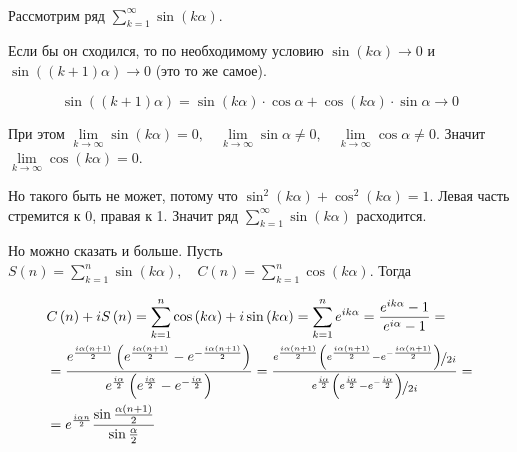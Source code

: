 \documentclass[../main.tex]{subfiles}
\begin{document}
\begin{example}
    
    ~

    Рассмотрим ряд \( \sum\limits_{ k=1}^{ \infty } \sin\left( k \alpha \right)\).

    Если бы он сходился, то по необходимому условию \( \sin\left( k \alpha \right) \longrightarrow 0\) и \( \sin \left( \left( k+1\right) \alpha \right) \longrightarrow 0\) (это то же самое). 

    \[ \sin\left( \left( k+1\right) \alpha \right)=\sin\left( k \alpha \right) \cdot \cos \alpha + \cos\left( k \alpha \right) \cdot \sin \alpha \longrightarrow 0\]

    При этом \( \lim\limits_{ k \rightarrow \infty } \sin\left( k \alpha \right) =0,\quad \lim\limits_{ k \rightarrow \infty } \sin \alpha \neq 0,\quad \lim\limits_{ k \rightarrow \infty } \cos \alpha \neq 0\). Значит \( \lim\limits_{ k \rightarrow \infty } \cos \left( k \alpha \right)=0\). 
    
    Но такого быть не может, потому что \( \sin^2\left( k \alpha \right)+\cos^2\left( k \alpha \right)=1\). Левая часть стремится к 0, правая к 1. Значит ряд \( \sum\limits_{ k=1}^{ \infty } \sin\left( k \alpha \right)\) расходится.

    Но можно сказать и больше. Пусть \( S\left( n\right)= \sum\limits_{ k=1}^{ n} \sin\left( k \alpha \right),\quad C\left( n\right)= \sum\limits_{ k=1}^{ n} \cos\left( k \alpha \right)\). Тогда

    \begin{equation*}
        \begin{aligned}
            & C\left( n\right)+iS\left( n\right)= \sum\limits_{ k=1}^{ n} \cos\left( k \alpha \right) + i\sin\left( k \alpha \right)= \sum\limits_{ k=1}^{ n} e^{ik \alpha }= \dfrac{ e^{ik\alpha}-1}{ e^{i\alpha}-1} =\\ 
            & = \dfrac{ e^\frac{{i\alpha}\left(n+1\right)}{ 2}\left(e^{\frac{i\alpha\left(n+1\right)}{2}}-e^{-\frac{i\alpha\left(n+1\right)}{2}}\right)}{ e^{ \frac{ i\alpha}{ 2} } \left( e^{ \frac{ i\alpha}{ 2}}-e^{ -\frac{ i\alpha}{ 2}}\right)} =\dfrac{ \nicefrac{ e^\frac{{i\alpha}\left(n+1\right)}{ 2}\left(e^{\frac{i\alpha\left(n+1\right)}{2}}-e^{-\frac{i\alpha\left(n+1\right)}{2}}\right)}{ 2i} }{ \nicefrac{ e^{\frac{i\alpha}{2} }\left(e^{\frac{i\alpha}{2}}-e^{-\frac{i\alpha}{2}}\right)}{2i} }=\\ 
            & = e^{ \frac{ i\alpha n}{ 2} } \dfrac{ \sin\frac{\alpha\left(n+1\right)}{ 2}}{ \sin \frac{ \alpha}{ 2} } 
        \end{aligned}
    \end{equation*}


\end{example}
\end{document}
